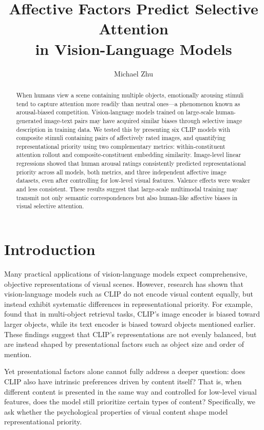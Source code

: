 \documentclass{article}
\title{Affective Factors Predict Selective Attention\\in Vision-Language Models}
\date{}
\author[1]{Michael Zhu}
\affil[1]{Department of Psychology}
\begin{document}
\maketitle

\begin{abstract}
When humans view a scene containing multiple objects, emotionally arousing
stimuli tend to capture attention more readily than neutral ones---a phenomenon
known as arousal-biased competition. Vision-language models trained on
large-scale human-generated image-text pairs may have acquired similar biases
through selective image description in training data. We tested this by
presenting six CLIP models with composite stimuli containing pairs of
affectively rated images, and quantifying representational priority using two
complementary metrics: within-constituent attention rollout and
composite-constituent embedding similarity. Image-level linear regressions
showed that human arousal ratings consistently predicted representational priority
across all models, both metrics, and three independent affective image datasets,
even after controlling for low-level visual features. Valence effects were
weaker and less consistent. These results suggest that large-scale multimodal
training may transmit not only semantic correspondences but also human-like
affective biases in visual selective attention.
\end{abstract}

\section{Introduction}
Many practical applications of vision-language models expect comprehensive, objective representations of visual scenes. However, research has shown that vision-language models such as CLIP do not encode visual content equally, but instead exhibit systematic differences in representational priority. For example, \citet{abbasiCLIPMicroscopeFineGrained2025} found that in multi-object retrieval tasks, CLIP's image encoder is biased toward larger objects, while its text encoder is biased toward objects mentioned earlier. These findings suggest that CLIP's representations are not evenly balanced, but are instead shaped by presentational factors such as object size and order of mention.

Yet presentational factors alone cannot fully address a deeper question: does CLIP also have intrinsic preferences driven by content itself? That is, when different content is presented in the same way and controlled for low-level visual features, does the model still prioritize certain types of content? Specifically, we ask whether the psychological properties of visual content shape model representational priority.
\end{document}
